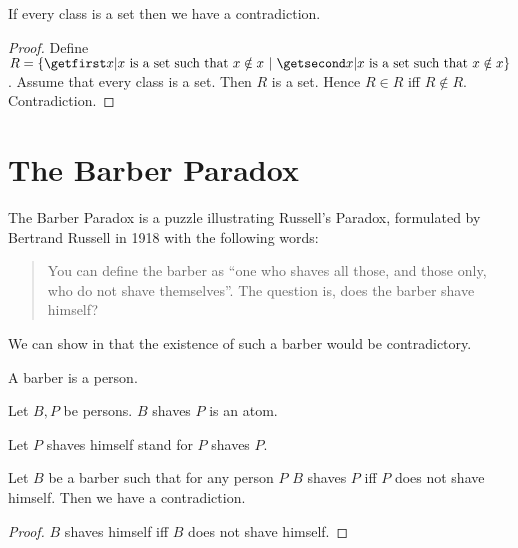 \documentclass{article}
\begin{document}
  \begin{forthel}
    \begin{theorem*}
      If every class is a set then we have a contradiction.
    \end{theorem*}
    \begin{proof}
      Define $R = \class{x | \text{$x$ is a set such that $x \notin x$}}$.
      Assume that every class is a set.
      Then $R$ is a set.
      Hence $R \in R$ iff $R \notin R$.
      Contradiction.
    \end{proof}
  \end{forthel}


  \section*{The Barber Paradox}

  The Barber Paradox is a puzzle illustrating Russell's Paradox, formulated by
  Bertrand Russell in 1918 with the following words:

  \begin{quotation}
    \noindent You can define the barber as \enquote{one who shaves all those,
    and those only, who do not shave themselves}.
    The question is, does the barber shave himself?
  \end{quotation}

  \noindent We can show in \Naproche that the existence of such a barber would
  be contradictory.

  \begin{forthel}
    \begin{signature*}
      A barber is a person.
    \end{signature*}

    \begin{signature*}
      Let $B, P$ be persons.
      $B$ shaves $P$ is an atom.
    \end{signature*}

    Let $P$ shaves himself stand for $P$ shaves $P$.

    \begin{theorem*}
      Let $B$ be a barber such that for any person $P$ $B$ shaves $P$ iff $P$
      does not shave himself.
      Then we have a contradiction.
    \end{theorem*}
    \begin{proof}
      $B$ shaves himself iff $B$ does not shave himself.
    \end{proof}
  \end{forthel}
\end{document}
